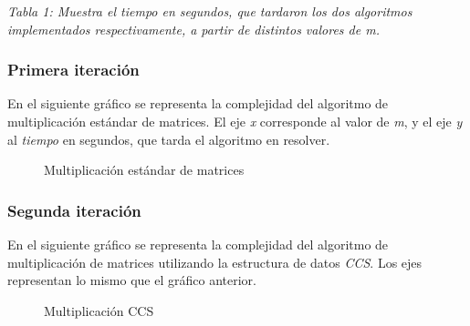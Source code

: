 \documentclass[a4paper,11pt]{article}
\begin{document}
\small\emph{Tabla 1: Muestra el tiempo en segundos, que tardaron los dos algoritmos implementados respectivamente, a partir de distintos valores de m.}

\subsubsection{Primera iteraci\'on}
En el siguiente gr\'afico se representa la complejidad del algoritmo de
multiplicaci\'on est\'andar de matrices. El eje \emph{x} corresponde al valor
de \emph{m}, y el eje \emph{y} al \emph{tiempo} en segundos, que tarda el
algoritmo en resolver.
\renewcommand{\figurename}{Figura}
\begin{figure}[H]
	\centerline{
    }
  	\caption{Multiplicaci\'on est\'andar de matrices}
  	\label{fig:normal}
\end{figure}

\subsubsection{Segunda iteraci\'on}
En el siguiente gr\'afico se representa la complejidad del algoritmo de
multiplicaci\'on de matrices utilizando la estructura de datos \emph{CCS}. Los
ejes representan lo mismo que el gr\'afico anterior.
\begin{figure}[H]
	\centerline{
    }
  	\caption{Multiplicaci\'on CCS}
  	\label{fig:ccs}
\end{figure}
\end{document}
